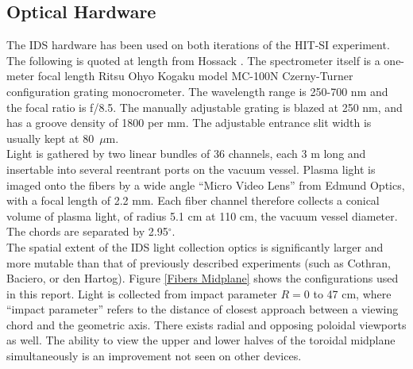 \subsection{Optical Hardware}
\hspace{4ex}The IDS hardware has been used on both iterations of the HIT-SI experiment. The following is quoted at length from  Hossack \cite{hossack2015study}. The spectrometer itself is a one-meter focal length Ritsu Ohyo Kogaku model MC-100N Czerny-Turner configuration grating monocrometer. The wavelength range is 250-700 nm and the focal ratio is f/8.5. The manually adjustable grating is blazed at 250 nm, and has a groove density of 1800 per mm. The adjustable entrance slit width is usually kept at 80~$\mu$m.\\
\hspace*{4ex}Light is gathered by two linear bundles of 36 channels, each 3 m long and insertable into several reentrant ports on the vacuum vessel. Plasma light is imaged onto the fibers by a wide angle ``Micro Video Lens'' from Edmund Optics, with a focal length of 2.2 mm. Each fiber channel therefore collects a conical volume of plasma light, of radius 5.1 cm at 110 cm, the vacuum vessel diameter. The chords are separated by 2.95$^{\circ}$.\\
\hspace*{4ex}The spatial extent of the IDS light collection optics is significantly larger and more mutable than that of previously described experiments (such as Cothran\cite{cothran2006fast}, Baciero\cite{Baciero2001JT-II}, or den Hartog\cite{den1994fast}). Figure \ref{Fibers Midplane} shows the configurations used in this report. Light is collected from impact parameter $R = 0$ to 47 cm, where ``impact parameter'' refers to the distance of closest approach between a viewing chord and the geometric axis. There exists radial and opposing poloidal viewports as well. The ability to view the upper and lower halves of the toroidal midplane simultaneously is an improvement not seen on other devices.
